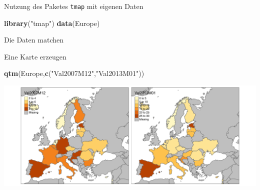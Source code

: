 \documentclass[ignorenonframetext,]{beamer}
\newenvironment{Shaded}{\begin{snugshade}}{\end{snugshade}}
\newcommand{\DecValTok}[1]{\textcolor[rgb]{0.00,0.00,0.81}{#1}}
\newcommand{\KeywordTok}[1]{\textcolor[rgb]{0.13,0.29,0.53}{\textbf{#1}}}
\newcommand{\NormalTok}[1]{#1}
\newcommand{\OperatorTok}[1]{\textcolor[rgb]{0.81,0.36,0.00}{\textbf{#1}}}
\newcommand{\StringTok}[1]{\textcolor[rgb]{0.31,0.60,0.02}{#1}}
\begin{document}
\begin{frame}[fragile]{Nutzung des Paketes \texttt{tmap} mit eigenen
Daten}
\protect\hypertarget{nutzung-des-paketes-tmap-mit-eigenen-daten}{}

\begin{Shaded}
\begin{Highlighting}[]
\KeywordTok{library}\NormalTok{(}\StringTok{"tmap"}\NormalTok{)}
\KeywordTok{data}\NormalTok{(Europe)}
\end{Highlighting}
\end{Shaded}

\begin{block}{Die Daten matchen}

\begin{Shaded}
\end{Shaded}

\end{block}

\end{frame}

\begin{frame}[fragile]{Eine Karte erzeugen}
\protect\hypertarget{eine-karte-erzeugen}{}

\begin{Shaded}
\begin{Highlighting}[]
\KeywordTok{qtm}\NormalTok{(Europe,}\KeywordTok{c}\NormalTok{(}\StringTok{"Val2007M12"}\NormalTok{,}\StringTok{"Val2013M01"}\NormalTok{))}
\end{Highlighting}
\end{Shaded}

\includegraphics{A4_tmap_files/figure-beamer/unnamed-chunk-49-1.pdf}

\end{frame}
\end{document}

